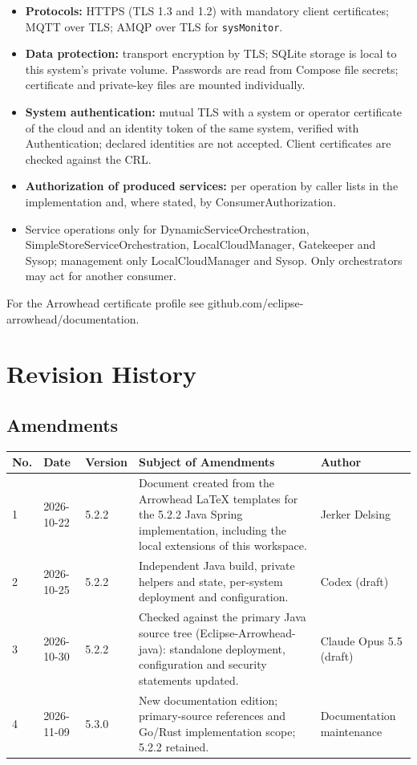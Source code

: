 \documentclass[a4paper]{arrowhead}
\begin{document}
\begin{itemize}
  \item \textbf{Protocols:} HTTPS (TLS 1.3 and 1.2) with mandatory client certificates; MQTT over TLS; AMQP over TLS for \texttt{sysMonitor}.
  \item \textbf{Data protection:} transport encryption by TLS; SQLite storage is local to this system's private volume. Passwords are read from Compose file secrets; certificate and private-key files are mounted individually.
  \item \textbf{System authentication:} mutual TLS with a system or operator certificate of the cloud and an identity token of the same system, verified with Authentication; declared identities are not accepted. Client certificates are checked against the CRL.
  \item \textbf{Authorization of produced services:} per operation by caller lists in the implementation and, where stated, by ConsumerAuthorization.
  \item Service operations only for Dynamic\allowbreak{}Service\allowbreak{}Orchestration, Simple\allowbreak{}Store\allowbreak{}Service\allowbreak{}Orchestration, LocalCloudManager, Gatekeeper and Sysop; management only LocalCloudManager and Sysop. Only orchestrators may act for another consumer.
\end{itemize}

For the Arrowhead certificate profile see github.com/eclipse-arrowhead/documentation.





\newpage

\section{Revision History}
\subsection{Amendments}

\noindent\begin{tabularx}{\textwidth}{| p{1cm} | p{3cm} | p{2cm} | X | p{4cm} |} \hline
\rowcolor{gray!33} No. & Date & Version & Subject of Amendments & Author \\ \hline

1 & 2026-10-22 & 5.2.2 & Document created from the Arrowhead LaTeX templates for the 5.2.2 Java Spring implementation, including the local extensions of this workspace. & Jerker Delsing \\ \hline
2 & 2026-10-25 & 5.2.2 & Independent Java build, private helpers and state, per-system deployment and configuration. & Codex (draft) \\ \hline
3 & 2026-10-30 & 5.2.2 & Checked against the primary Java source tree (Eclipse-Arrowhead-java): standalone deployment, configuration and security statements updated. & Claude Opus 5.5 (draft) \\ \hline
4 & 2026-11-09 & 5.3.0 & New documentation edition; primary-source references and Go/Rust implementation scope; 5.2.2 retained. & Documentation maintenance \\ \hline
\end{tabularx}
\end{document}
